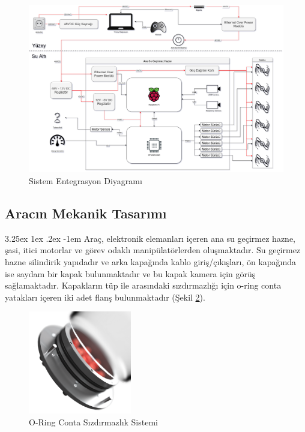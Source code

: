 \documentclass[12pt]{article}
\makeatletter
\renewcommand\paragraph{\@startsection{paragraph}{5}{\z@}%
  {3.25ex \@plus1ex \@minus.2ex}%
  {-1em}%
  {\normalfont\normalsize\bfseries}}
\makeatother
\begin{document}
\newpage

\begin{figure}[hbt!]
\centering
\includegraphics[width=1\textwidth]{SID.png}
\caption{Sistem Entegrasyon Diyagramı}
\label{fig:SID}
\end{figure}

\subsection{Aracın Mekanik Tasarımı}
\paragraph{} Araç, elektronik elemanları içeren ana su geçirmez hazne, şasi, itici motorlar ve görev odaklı manipülatörlerden oluşmaktadır. Su geçirmez hazne silindirik yapıdadır ve arka kapağında kablo giriş/çıkışları, ön kapağında ise saydam bir kapak bulunmaktadır ve bu kapak kamera için görüş sağlamaktadır. Kapakların tüp ile arasındaki sızdırmazlığı için o-ring conta yatakları içeren iki adet flanş bulunmaktadır (Şekil \ref{fig:oring}). 

\begin{figure}[hbt!]
\centering
\includegraphics[width=0.4\textwidth]{oring.png}
\caption{O-Ring Conta Sızdırmazlık Sistemi}
\label{fig:oring}
\end{figure}
\end{document}
